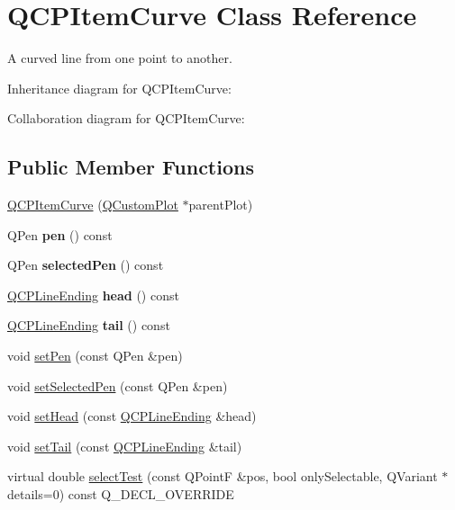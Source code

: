 \hypertarget{classQCPItemCurve}{}\section{Q\+C\+P\+Item\+Curve Class Reference}
\label{classQCPItemCurve}


A curved line from one point to another.  




Inheritance diagram for Q\+C\+P\+Item\+Curve\+:


Collaboration diagram for Q\+C\+P\+Item\+Curve\+:
\subsection*{Public Member Functions}
\begin{DoxyCompactItemize}
\item 
\hyperlink{classQCPItemCurve_ac9b7508bb5c8827e1a7a6199f8c82bec}{Q\+C\+P\+Item\+Curve} (\hyperlink{classQCustomPlot}{Q\+Custom\+Plot} $\ast$parent\+Plot)
\item 
Q\+Pen {\bfseries pen} () const \hypertarget{classQCPItemCurve_abc6321e55a9ba1a0c7df407843dfa252}{}\label{classQCPItemCurve_abc6321e55a9ba1a0c7df407843dfa252}

\item 
Q\+Pen {\bfseries selected\+Pen} () const \hypertarget{classQCPItemCurve_abd8b8be5b13bc4dafec4c1758c281336}{}\label{classQCPItemCurve_abd8b8be5b13bc4dafec4c1758c281336}

\item 
\hyperlink{classQCPLineEnding}{Q\+C\+P\+Line\+Ending} {\bfseries head} () const \hypertarget{classQCPItemCurve_afc067f0d1e60cd04812f2c2c7fdf36c3}{}\label{classQCPItemCurve_afc067f0d1e60cd04812f2c2c7fdf36c3}

\item 
\hyperlink{classQCPLineEnding}{Q\+C\+P\+Line\+Ending} {\bfseries tail} () const \hypertarget{classQCPItemCurve_a9adddfcc5275be0cf27e3c0c31c37c1a}{}\label{classQCPItemCurve_a9adddfcc5275be0cf27e3c0c31c37c1a}

\item 
void \hyperlink{classQCPItemCurve_a034be908440aec785c34b92843461221}{set\+Pen} (const Q\+Pen \&pen)
\item 
void \hyperlink{classQCPItemCurve_a375b917669f868c5a106bf2f1ab7c26d}{set\+Selected\+Pen} (const Q\+Pen \&pen)
\item 
void \hyperlink{classQCPItemCurve_a08a30d9cdd63995deea3d9e20430676f}{set\+Head} (const \hyperlink{classQCPLineEnding}{Q\+C\+P\+Line\+Ending} \&head)
\item 
void \hyperlink{classQCPItemCurve_ac3488d8b1a6489c845dc5bff3ef71124}{set\+Tail} (const \hyperlink{classQCPLineEnding}{Q\+C\+P\+Line\+Ending} \&tail)
\item 
virtual double \hyperlink{classQCPItemCurve_a718fa40140a43c8afbd41a3d85c92d72}{select\+Test} (const Q\+PointF \&pos, bool only\+Selectable, Q\+Variant $\ast$details=0) const Q\+\_\+\+D\+E\+C\+L\+\_\+\+O\+V\+E\+R\+R\+I\+DE
\end{DoxyCompactItemize}
